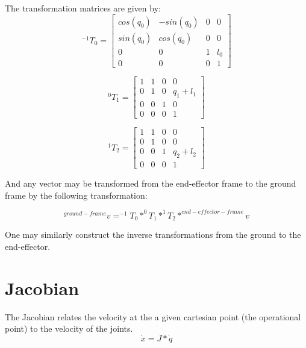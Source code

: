 \documentclass[12pt]{article}
\begin{document}
The transformation matrices are given by:
\begin{equation}
  ^{-1} T_{0} = 
  \begin{bmatrix} 
  cos(q_0) & -sin(q_0) & 0 & 0 \\ 
  sin(q_0) & cos(q_0) & 0 & 0 \\
  0 & 0 & 1 & l_{0} \\
  0 & 0 & 0 & 1 
  \end{bmatrix}
\end{equation}

\begin{equation}
  ^0 T_{1} = 
  \begin{bmatrix} 
  1 & 1 & 0 & 0 \\ 
  0 & 1 & 0 & q_1+l_{1} \\
  0 & 0 & 1 & 0 \\
  0 & 0 & 0 & 1 
  \end{bmatrix}
\end{equation}

\begin{equation}
  ^1 T_{2} = 
  \begin{bmatrix} 
  1 & 1 & 0 & 0 \\ 
  0 & 1 & 0 & 0 \\
  0 & 0 & 1 & q_2+l_{2} \\
  0 & 0 & 0 & 1 
  \end{bmatrix}
\end{equation}

And any vector may be transformed from the end-effector frame to the ground
frame by the following transformation:

\begin{equation}
  ^{ground-frame} v =  ^{-1} T_0 * ^0 T_1 * ^1 T_2 * ^{end-effector-frame} v
\end{equation}

One may similarly construct the inverse transformations from the ground to the end-effector.

\section{Jacobian}
The Jacobian relates the velocity at the a given cartesian point (the operational point)
 to the velocity of the joints.
\begin{equation}
  \dot x = J * \dot q
\end{equation}
\end{document}
